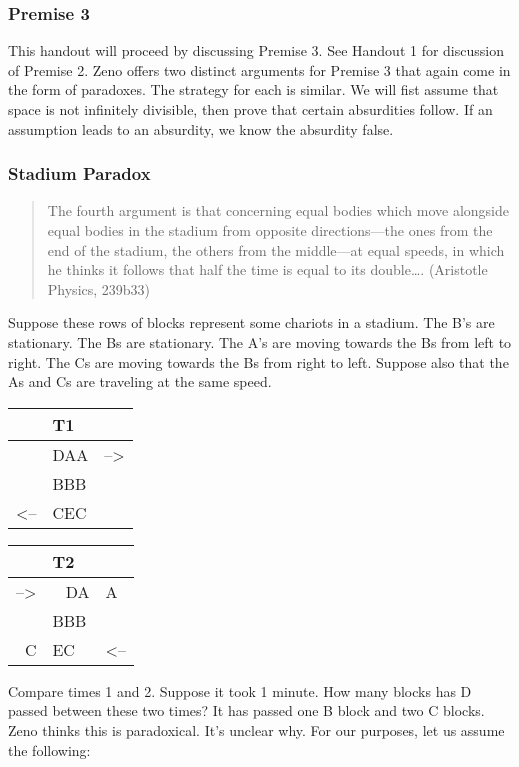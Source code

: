 \documentclass[]{article}
\begin{document}
\subsubsection{Premise 3}\label{premise-3}

This handout will proceed by discussing Premise 3. See Handout 1 for
discussion of Premise 2. Zeno offers two distinct arguments for Premise
3 that again come in the form of paradoxes. The strategy for each is
similar. We will fist assume that space is not infinitely divisible,
then prove that certain absurdities follow. If an assumption leads to an
absurdity, we know the absurdity false.

\subsubsection{Stadium Paradox}\label{stadium-paradox}

\begin{quote}
The fourth argument is that concerning equal bodies which move alongside
equal bodies in the stadium from opposite directions---the ones from the
end of the stadium, the others from the middle---at equal speeds, in
which he thinks it follows that half the time is equal to its
double\ldots{}. (Aristotle Physics, 239b33)
\end{quote}

Suppose these rows of blocks represent some chariots in a stadium. The
B's are stationary. The Bs are stationary. The A's are moving towards
the Bs from left to right. The Cs are moving towards the Bs from right
to left. Suppose also that the As and Cs are traveling at the same
speed.

\begin{longtable}[c]{@{}lll@{}}
\toprule
& T1 &\tabularnewline
\midrule
\endhead
& DAA & --\textgreater{}\tabularnewline
& BBB &\tabularnewline
\textless{}-- & CEC &\tabularnewline
\bottomrule
\end{longtable}

\begin{longtable}[c]{@{}rll@{}}
\toprule
& T2 &\tabularnewline
\midrule
\endhead
--\textgreater{} & ~ DA & A\tabularnewline
& BBB &\tabularnewline
C & EC~ & \textless{}--\tabularnewline
\bottomrule
\end{longtable}

Compare times 1 and 2. Suppose it took 1 minute. How many blocks has D
passed between these two times? It has passed one B block and two C
blocks. Zeno thinks this is paradoxical. It's unclear why. For our
purposes, let us assume the following:
\end{document}
